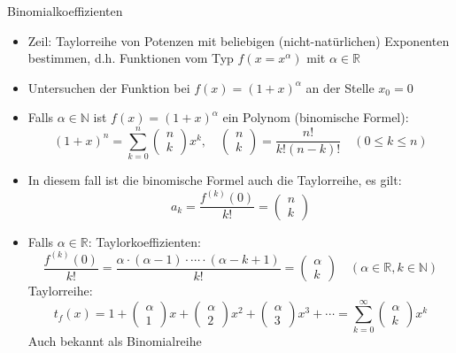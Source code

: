 \begin{lemma}{Binomialkoeffizienten}\\
  \begin{itemize}
    \item Zeil: Taylorreihe von Potenzen mit beliebigen (nicht-natürlichen) Exponenten bestimmen, d.h. Funktionen vom
      Typ \(f(x=x^{\alpha})\) mit \(\alpha \in \mathbb{R}\)
    \item Untersuchen der Funktion bei \(f(x)=(1+x)^{\alpha}\) an der Stelle \(x_0=0\)
    \item Falls \(\alpha\in\mathbb{N}\) ist \(f(x)=(1+x)^{\alpha}\) ein Polynom (binomische Formel):
      \[(1+x)^n=\sum_{k=0}^n{\begin{pmatrix}n\\k\end{pmatrix}x^k},\quad
      \begin{pmatrix}n\\k\end{pmatrix}=\frac{n!}{k!(n-k)!}\quad (0\le k \le n)\]
    \item In diesem fall ist die binomische Formel auch die Taylorreihe, es gilt:
      \[a_k=\frac{f^{(k)}(0)}{k!}=\begin{pmatrix}n\\k\end{pmatrix}\]
    \item Falls \(\alpha\in\mathbb{R}\):
    \subitem Taylorkoeffizienten:
    \[\frac{f^{(k)}(0)}{k!}=\frac{\alpha\cdot(\alpha -1)\cdot\cdots\cdot(\alpha-k+1)}{k!}= 
      \begin{pmatrix}\alpha\\k\end{pmatrix}\quad (\alpha\in\mathbb{R},k\in\mathbb{N})\]
    \subitem Taylorreihe:
    \[t_f(x)=1+\begin{pmatrix}\alpha\\1\end{pmatrix}x+\begin{pmatrix}\alpha\\2\end{pmatrix}x^2+
    \begin{pmatrix}\alpha\\3\end{pmatrix}x^3+\cdots =\sum_{k=0}^{\infty}{\begin{pmatrix}\alpha\\k\end{pmatrix}x^k}\]
    Auch bekannt als Binomialreihe
  \end{itemize}
\end{lemma}
